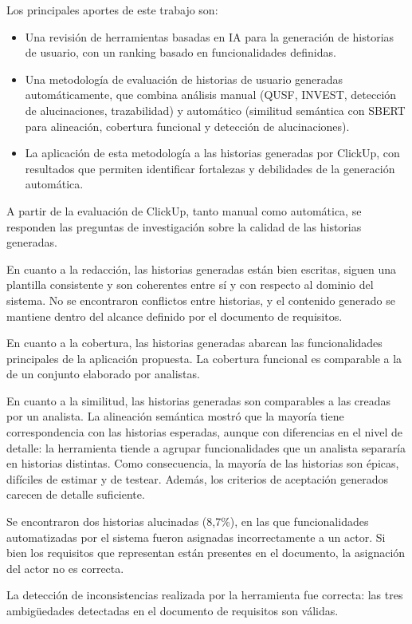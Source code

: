 Los principales aportes de este trabajo son:
\begin{itemize}
    \item Una revisión de herramientas basadas en IA para la generación de historias de usuario, con un ranking basado en funcionalidades definidas.
    \item Una metodología de evaluación de historias de usuario generadas automáticamente, que combina análisis manual (QUSF, INVEST, detección de alucinaciones, trazabilidad) y automático (similitud semántica con SBERT para alineación, cobertura funcional y detección de alucinaciones).
    \item La aplicación de esta metodología a las historias generadas por ClickUp, con resultados que permiten identificar fortalezas y debilidades de la generación automática.
\end{itemize}

A partir de la evaluación de ClickUp, tanto manual como automática, se responden las preguntas de investigación sobre la calidad de las historias generadas.

En cuanto a la redacción, las historias generadas están bien escritas, siguen una plantilla consistente y son coherentes entre sí y con respecto al dominio del sistema. No se encontraron conflictos entre historias, y el contenido generado se mantiene dentro del alcance definido por el documento de requisitos.

En cuanto a la cobertura, las historias generadas abarcan las funcionalidades principales de la aplicación propuesta. La cobertura funcional es comparable a la de un conjunto elaborado por analistas.

En cuanto a la similitud, las historias generadas son comparables a las creadas por un analista. La alineación semántica mostró que la mayoría tiene correspondencia con las historias esperadas, aunque con diferencias en el nivel de detalle: la herramienta tiende a agrupar funcionalidades que un analista separaría en historias distintas. Como consecuencia, la mayoría de las historias son épicas, difíciles de estimar y de testear. Además, los criterios de aceptación generados carecen de detalle suficiente.

Se encontraron dos historias alucinadas (8,7\%), en las que funcionalidades automatizadas por el sistema fueron asignadas incorrectamente a un actor. Si bien los requisitos que representan están presentes en el documento, la asignación del actor no es correcta.

La detección de inconsistencias realizada por la herramienta fue correcta: las tres ambigüedades detectadas en el documento de requisitos son válidas.

